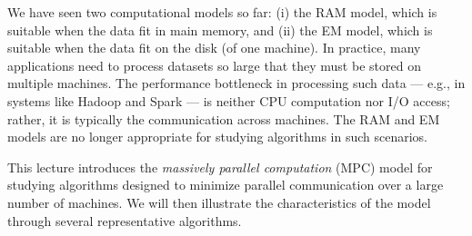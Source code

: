 



\usepackage{wasysym}

\title{}
\author{}
\date{}


\def\A{\mathcal{A}}
\def\C{\mathcal{C}}
\def\E{\mathcal{E}}
\def\FF{\EuScript{F}}
\def\G{\mathcal{G}}
\def\GG{\EuScript{G}}
\def\H{\mathcal{H}}
\def\I{\mathcal{I}}
\def\J{\mathcal{J}}
\def\L{\mathcal{L}}
\def\Q{\mathcal{Q}}
\def\S{\mathcal{S}}
\def\T{\mathcal{T}}
\def\V{\mathcal{V}}
\def\W{\mathscr{W}}
\def\X{\mathcal{X}}
\def\Y{\mathcal{Y}}
\def\Z{\mathcal{Z}}
\def\att{\mit{diffatt}}
\def\agm{\mathit{AGM}}
\def\boldatt{\mathbf{att}}
\def\ext{\mathit{ext}}
\def\In{\mathrm{IN}}
\def\join{\mathit{join}}
\def\Out{\mathrm{OUT}}
\def\schema{\mathit{schema}}

\def\extraspacing{\vspace{4mm} \noindent}
\def\vgap{\vspace{4mm}}
\def\vslit{\vspace{2mm}}




We have seen two computational models so far: (i) the RAM model, which is suitable when the data fit in main memory, and (ii) the EM model, which is suitable when the data fit on the disk (of one machine). In practice, many applications need to process datasets so large that they must be stored on multiple machines. The performance bottleneck in processing such data --- e.g., in systems like Hadoop and Spark --- is neither CPU computation nor I/O access; rather, it is typically the communication across machines. The RAM and EM models are no longer appropriate for studying algorithms in such scenarios.

\vgap

This lecture introduces the {\em massively parallel computation} (MPC) model \cite{bks17c,ksv10} for studying algorithms designed to minimize parallel communication over a large number of machines. We will then illustrate the characteristics of the model through several representative algorithms.

